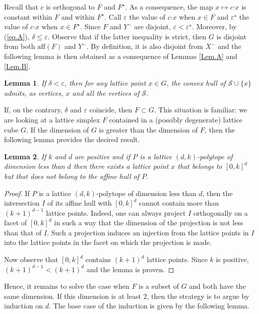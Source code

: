 \documentclass[a4paper]{article}
\newtheorem{lemma}{Lemma}[subsection]
\renewcommand{\S}{\mathcal{S}}
\begin{document}
Recall that $c$ is orthogonal to $F$ and $F^\star$. As a consequence, the map $x\mapsto{c\mathord{\cdot}x}$ is constant within $F$ and within $F^\star$. Call $\varepsilon$ the value of $c\mathord{\cdot}x$ when $x\in{F}$ and $\varepsilon^\star$ the value of $c\mathord{\cdot}x$ when $x\in{F^\star}$. Since $F$ and $Y^-$ are disjoint, $\varepsilon<\varepsilon^\star$. Moreover, by (\ref{eq.A}), $\delta\leq\varepsilon$. Observe that if the latter inequality is strict, then $G$ is disjoint from both $\mathrm{aff}(F)$ and $Y^-$. By definition, it is also disjoint from $X^-$ and the following lemma is then obtained as a consequence of Lemmas \ref{Lem.A} and \ref{Lem.B}.
\begin{lemma}\label{Lem.BC}
If $\delta<\varepsilon$, then for any lattice point $x\in{G}$, the convex hull of $\S\cup\{x\}$ admits, as vertices, $x$ and all the vertices of $\S$.
\end{lemma}

If, on the contrary, $\delta$ and $\varepsilon$ coincide, then $F\subset{G}$. This situation is familiar: we are looking at a lattice simplex $F$ contained in a (possibly degenerate) lattice cube $G$. If the dimension of $G$ is greater than the dimension of $F$, then the following lemma provides the desired result.

\begin{lemma}\label{Lem.C}
If $k$ and $d$ are positive and if $P$ is a lattice $(d,k)$-polytope of dimension less than $d$ then there exists a lattice point $x$ that belongs to $[0,k]^d$ but that does not belong to the affine hull of $P$.
\end{lemma}
\begin{proof}
If $P$ is a lattice $(d,k)$-polytope of dimension less than $d$, then the intersection $I$ of its affine hull with $[0,k]^d$ cannot contain more than $(k+1)^{d-1}$ lattice points. Indeed, one can always project $I$ orthogonally on a facet of $[0,k]^d$ in such a way that the dimension of the projection is not less than that of $I$. Such a projection induces an injection from the lattice points in $I$ into the lattice points in the facet on which the projection is made.

Now observe that $[0,k]^d$ contains $(k+1)^d$ lattice points. Since $k$ is positive, $(k+1)^{d-1}<(k+1)^d$ and the lemma is proven.
\end{proof}

Hence, it remains to solve the case when $F$ is a subset of $G$ and both have the same dimension. If this dimension is at least $2$, then the strategy is to argue by induction on $d$. The base case of the induction is given by the following lemma.
\end{document}
